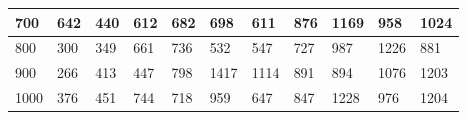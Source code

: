 \documentclass[10pt,letterpaper]{article}
\begin{document}
\begin{center}
\begin{table}
\begin{tabular} { |m{0.5cm}|m{1.3cm}|m{1.3cm}|m{1.3cm}|m{1.3cm}|m{1.3cm}|m{1.3cm}|m{1.3cm}|m{1.3cm}|m{1.3cm}|m{1.3cm}|}
\hline
\cellcolor{Gray}700 & \Large 642 & \Large 440 & \Large 612 & \Large 682 & \Large 698 & \Large 611 & \Large 876 & \Large 1169 & \Large 958 & \Large 1024 \\
\hline
\cellcolor{Gray}800 & \Large 300 & \Large 349 & \Large 661 & \Large 736 & \Large 532 & \Large 547 & \Large 727 & \Large 987 & \Large 1226 & \Large 881 \\
\hline
\cellcolor{Gray}900 & \Large 266 & \Large 413 & \Large 447 & \Large 798 & \Large 1417 & \Large 1114 & \Large 891 & \Large 894 & \Large 1076 & \Large 1203 \\
\hline
\cellcolor{Gray}1000 & \Large 376 & \Large 451 & \Large 744 & \Large 718 & \Large 959 & \Large 647 & \Large 847 & \Large 1228 & \Large 976 & \Large 1204 \\
\hline
\end{tabular} \\
\end{table}
\end{center}
\newpage 
{}
\end{document}
